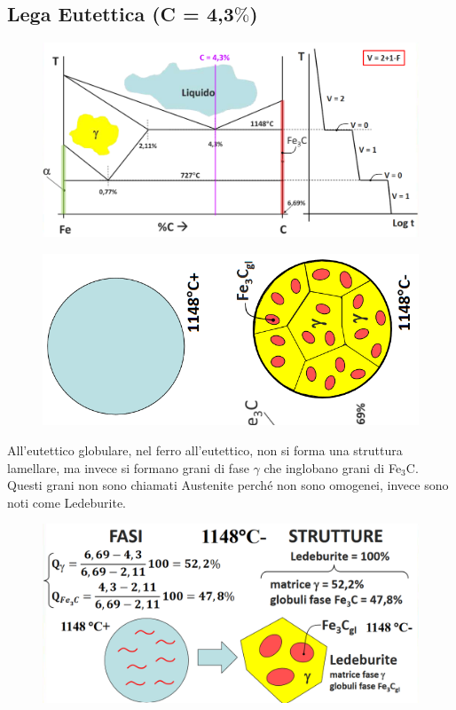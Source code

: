 \documentclass{article}
\begin{document}
{        \subsection{Lega Eutettica (C = 4,3$\%$)}
            \begin{figure}[h!]
                \centering
                \includegraphics[width=.7\linewidth]{L14 - C = 4,3 Diagramma di Stato e Traiettoria di Raffreddamento.png}
            \end{figure}
            \begin{figure}[h!]
                \centering
                \includegraphics[width=.7\linewidth]{L14 - C = 4,3 Strutture 1148+ a 1148-.png}
            \end{figure}
            All'eutettico globulare, nel ferro all'eutettico, non si forma una struttura lamellare, ma invece si formano grani di fase $\gamma$ che inglobano grani di Fe$_3$C. Questi grani non sono chiamati Austenite perch\'e non sono omogenei, invece sono noti come Ledeburite.\\
            \begin{figure}[h!]
                \centering
                \includegraphics[width=.7\linewidth]{L14 - C = 4,3 Calcolo 1148-.png}

\end{figure}}
\end{document}
